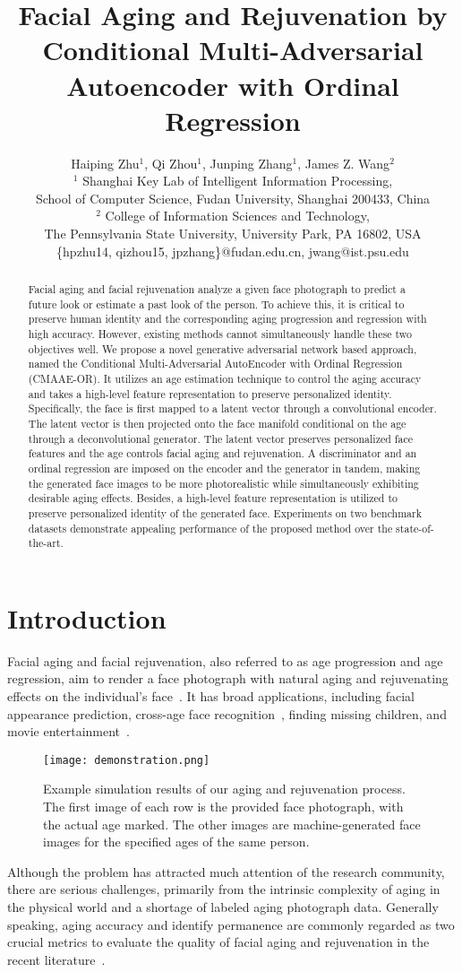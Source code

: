 \documentclass{article}
\title{Facial Aging and Rejuvenation by Conditional Multi-Adversarial Autoencoder with Ordinal Regression}
\author{
Haiping Zhu$^1$,
Qi Zhou$^1$,
Junping Zhang$^1$,
James Z. Wang$^2$
\\ 
$^1$ Shanghai Key Lab of Intelligent Information Processing, \\
School of Computer Science, Fudan University, Shanghai 200433, China \\
$^2$ College of Information Sciences and Technology, \\
The Pennsylvania State University, University Park, PA 16802, USA \\
\{hpzhu14, qizhou15, jpzhang\}@fudan.edu.cn,
jwang@ist.psu.edu
}
\begin{document}
\maketitle
\begin{abstract}
Facial aging and facial rejuvenation analyze a given face photograph to predict a future look or estimate a past look of the person. To achieve this, it is critical to preserve human identity and the corresponding aging progression and regression with high accuracy. However, existing methods cannot simultaneously handle these two objectives well. We propose a novel generative adversarial network based approach, named the Conditional Multi-Adversarial AutoEncoder with Ordinal Regression (CMAAE-OR). It utilizes an age estimation technique to control the aging accuracy and takes a high-level feature representation to preserve personalized identity. Specifically, the face is first mapped to a latent vector through a convolutional encoder. The latent vector is then projected onto the face manifold conditional on the age through a deconvolutional generator. The latent vector preserves personalized face features and the age controls facial aging and rejuvenation. A discriminator and an ordinal regression are imposed on the encoder and the generator in tandem, making the generated face images to be more photorealistic while simultaneously exhibiting desirable aging effects. Besides, a high-level feature representation is utilized to preserve personalized identity of the generated face.  Experiments on two benchmark datasets demonstrate appealing performance of the proposed method over the state-of-the-art.
\end{abstract}

\section{Introduction}\label{intro}
Facial aging and facial rejuvenation, also referred to as age progression and age regression, aim to render a face photograph with natural aging and rejuvenating effects on the individual's face~\cite{fu2010age}. It has broad applications, including facial appearance prediction, cross-age face recognition~\cite{park2010age}, finding missing children, and movie entertainment~\cite{wang2016recurrent}.
\begin{figure}[!ht]
\centering
\texttt{[image: demonstration.png]}
\caption{Example simulation results of our aging and rejuvenation process. The first image of each row is the provided face photograph, with the actual age marked. The other images are machine-generated face images for the specified ages of the same person.
}
\label{demonstration}
\end{figure}
Although the problem has attracted much attention of the research community, there are serious challenges, primarily from the intrinsic complexity of aging in the physical world and a shortage of labeled aging photograph data. Generally speaking, aging accuracy and identify permanence are commonly regarded as two crucial metrics to evaluate the quality of facial aging and rejuvenation in the recent literature~\cite{shu2015personalized,suo2010compositional,yang2016face}. 
\end{document}
